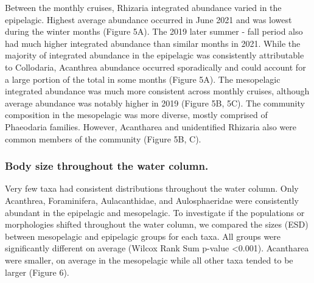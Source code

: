 \documentclass[
]{article}
\begin{document}
Between the monthly cruises, Rhizaria integrated abundance varied in the
epipelagic. Highest average abundance occurred in June 2021 and was
lowest during the winter months (Figure 5A). The 2019 later summer -
fall period also had much higher integrated abundance than similar
months in 2021. While the majority of integrated abundance in the
epipelagic was consistently attributable to Collodaria, Acanthrea
abundance occurred sporadically and could account for a large portion of
the total in some months (Figure 5A). The mesopelagic integrated
abundance was much more consistent across monthly cruises, although
average abundance was notably higher in 2019 (Figure 5B, 5C). The
community composition in the mesopelagic was more diverse, mostly
comprised of Phaeodaria families. However, Acantharea and unidentified
Rhizaria also were common members of the community (Figure 5B, C).

\subsubsection{Body size throughout the water
column.}\label{body-size-throughout-the-water-column.}

Very few taxa had consistent distributions throughout the water column.
Only Acanthrea, Foraminifera, Aulacanthidae, and Aulosphaeridae were
consistently abundant in the epipelagic and mesopelagic. To investigate
if the populations or morphologies shifted throughout the water column,
we compared the sizes (ESD) between mesopelagic and epipelagic groups
for each taxa. All groups were significantly different on average
(Wilcox Rank Sum p-value \textless0.001). Acantharea were smaller, on
average in the mesopelagic while all other taxa tended to be larger
(Figure 6).
\end{document}
